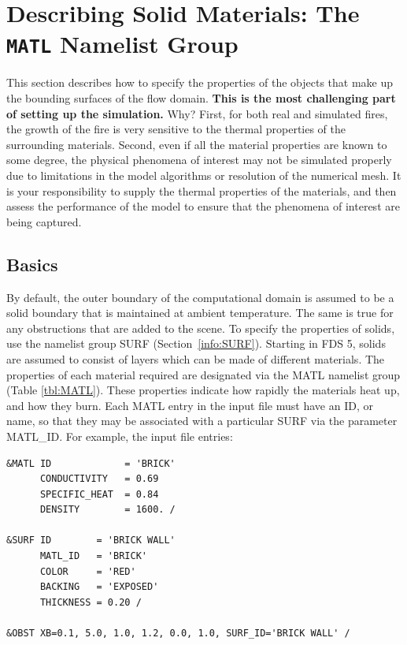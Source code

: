 \documentclass[11pt]{book}
\begin{document}
\section{Describing Solid Materials: The \texorpdfstring{{\tt MATL}}{MATL} Namelist Group}
\label{info:MATL}

This section describes how to specify the properties of the objects
that make up the bounding surfaces of the flow domain. {\bf This is
the most challenging part of setting up the simulation.} Why?  First,
for both real and simulated fires, the growth of the fire is very
sensitive to the thermal properties of the surrounding
materials. Second, even if all the material properties are known to
some degree, the physical phenomena of interest may not be simulated
properly due to limitations in the model algorithms or resolution of
the numerical mesh. It is your responsibility to supply the thermal
properties of the materials, and then assess the performance of the
model to ensure that the phenomena of interest are being captured.


\subsection{Basics}

By default, the outer boundary of the computational domain is assumed
to be a solid boundary that is maintained at ambient temperature. The
same is true for any obstructions that are added to the scene. To
specify the properties of solids, use the namelist group {\ct SURF}
(Section~\ref{info:SURF}). Starting in FDS 5, solids are assumed to
consist of layers which can be made of different materials.  The
properties of each material required are designated via the {\ct MATL}
namelist group (Table \ref{tbl:MATL}).  These properties indicate how
rapidly the materials heat up, and how they burn.  Each {\ct MATL}
entry in the input file must have an {\ct ID}, or name, so that they
may be associated with a particular {\ct SURF} via the parameter {\ct
MATL\_ID}.  For example, the input file entries:

\footnotesize
\begin{verbatim}
&MATL ID             = 'BRICK'
      CONDUCTIVITY   = 0.69
      SPECIFIC_HEAT  = 0.84
      DENSITY        = 1600. /

&SURF ID        = 'BRICK WALL'
      MATL_ID   = 'BRICK'
      COLOR     = 'RED'
      BACKING   = 'EXPOSED'
      THICKNESS = 0.20 /

&OBST XB=0.1, 5.0, 1.0, 1.2, 0.0, 1.0, SURF_ID='BRICK WALL' /
\end{verbatim}
\normalsize
\end{document}
